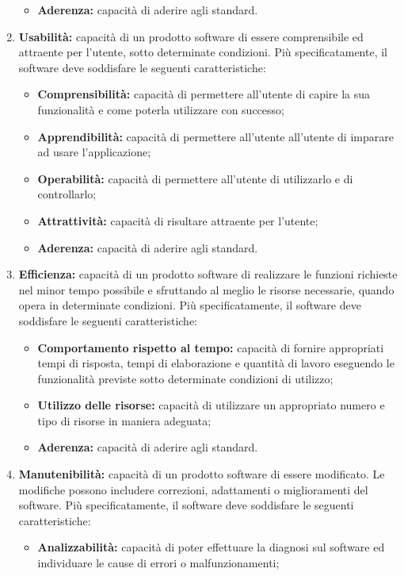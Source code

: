 \begin{enumerate}
\begin{itemize}
 		\item \textbf{Aderenza:} capacità di aderire agli standard.
 	\end{itemize}
 	\item \textbf{Usabilità:} capacità di un prodotto software di essere comprensibile ed attraente per l’utente, sotto determinate condizioni. Più specificatamente, il software deve soddisfare le seguenti caratteristiche:
 	\begin{itemize}
 		\item \textbf{Comprensibilità:} capacità di permettere all’utente di capire la sua funzionalità e come poterla utilizzare con successo;
 		\item \textbf{Apprendibilità:} capacità di permettere all’utente all’utente di imparare ad usare l’applicazione;
 		\item \textbf{Operabilità:} capacità di permettere all’utente di utilizzarlo e di controllarlo;
 		\item \textbf{Attrattività:} capacità di risultare attraente per l’utente;
 		\item \textbf{Aderenza:} capacità di aderire agli standard.
 	\end{itemize}
 	\item \textbf{Efficienza:} capacità di un prodotto software di realizzare le funzioni richieste nel minor tempo possibile e sfruttando al meglio le risorse necessarie, quando opera in determinate condizioni. Più specificatamente, il software deve soddisfare le seguenti caratteristiche:
 	\begin{itemize}
 		\item \textbf{Comportamento rispetto al tempo:} capacità di fornire appropriati tempi di risposta, tempi di elaborazione e quantità di lavoro eseguendo le funzionalità previste sotto determinate condizioni di utilizzo;
 		\item \textbf{Utilizzo delle risorse:} capacità di utilizzare un appropriato numero e tipo di risorse in maniera adeguata;
 		\item \textbf{Aderenza:} capacità di aderire agli standard.
 	\end{itemize}
 	\item \textbf{Manutenibilità:} capacità di un prodotto software di essere modificato. Le modifiche possono includere correzioni, adattamenti o miglioramenti del software. Più specificatamente, il software deve soddisfare le seguenti caratteristiche:
 	\begin{itemize}
 		\item \textbf{Analizzabilità:} capacità di poter effettuare la diagnosi sul software ed individuare le cause di errori o malfunzionamenti;

\end{itemize}
\end{enumerate}
